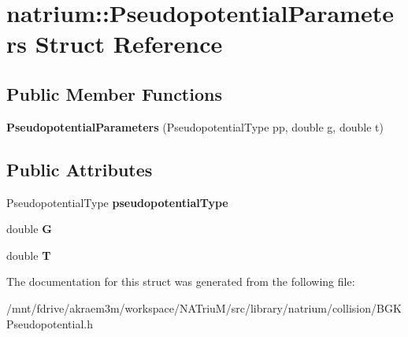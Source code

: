 \hypertarget{structnatrium_1_1PseudopotentialParameters}{
\section{natrium::PseudopotentialParameters Struct Reference}
\label{structnatrium_1_1PseudopotentialParameters}
}
\subsection*{Public Member Functions}
\begin{DoxyCompactItemize}
\item 
\hypertarget{structnatrium_1_1PseudopotentialParameters_a99a109a34fcfa1a8dfc83e2eb19e2b34}{
{\bfseries PseudopotentialParameters} (PseudopotentialType pp, double g, double t)}
\label{structnatrium_1_1PseudopotentialParameters_a99a109a34fcfa1a8dfc83e2eb19e2b34}

\end{DoxyCompactItemize}
\subsection*{Public Attributes}
\begin{DoxyCompactItemize}
\item 
\hypertarget{structnatrium_1_1PseudopotentialParameters_a72af9228ebea141c545c658d6eecafee}{
PseudopotentialType {\bfseries pseudopotentialType}}
\label{structnatrium_1_1PseudopotentialParameters_a72af9228ebea141c545c658d6eecafee}

\item 
\hypertarget{structnatrium_1_1PseudopotentialParameters_adad735f547c3ecec7011b39fb9d38288}{
double {\bfseries G}}
\label{structnatrium_1_1PseudopotentialParameters_adad735f547c3ecec7011b39fb9d38288}

\item 
\hypertarget{structnatrium_1_1PseudopotentialParameters_ae9585720dfaa64f31ba198caa6532618}{
double {\bfseries T}}
\label{structnatrium_1_1PseudopotentialParameters_ae9585720dfaa64f31ba198caa6532618}

\end{DoxyCompactItemize}


The documentation for this struct was generated from the following file:\begin{DoxyCompactItemize}
\item 
/mnt/fdrive/akraem3m/workspace/NATriuM/src/library/natrium/collision/BGKPseudopotential.h\end{DoxyCompactItemize}

